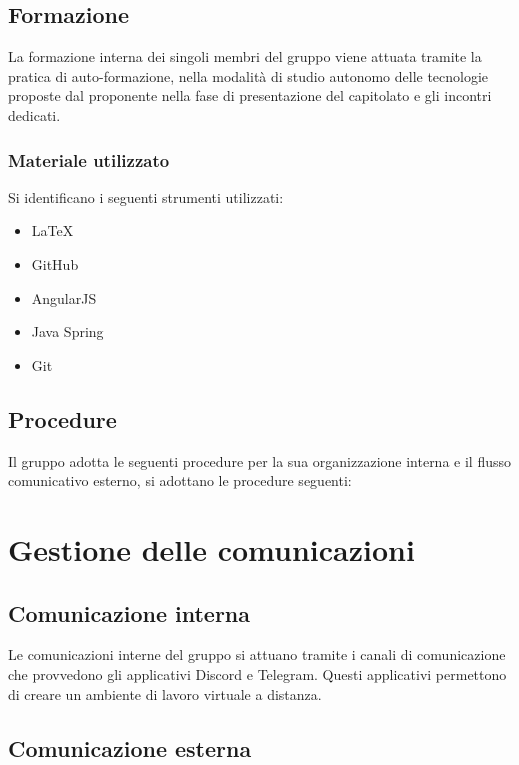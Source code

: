 \subsection{Formazione}

La formazione interna dei singoli membri del gruppo viene attuata tramite la pratica di auto-formazione, nella modalità di studio autonomo delle tecnologie proposte dal proponente nella fase di presentazione del capitolato e gli incontri dedicati.

\subsubsection{Materiale utilizzato}

Si identificano i seguenti strumenti utilizzati:

\begin{itemize}
\item LaTeX
\item GitHub
\item AngularJS
\item Java Spring
\item Git
\end{itemize}

\subsection{Procedure}

Il gruppo adotta le seguenti procedure per la sua organizzazione interna e il flusso comunicativo esterno, si adottano le procedure seguenti:

\section{Gestione delle comunicazioni}

\subsection{Comunicazione interna}

Le comunicazioni interne del gruppo si attuano tramite i canali di comunicazione che provvedono gli applicativi Discord e Telegram. Questi applicativi permettono di creare un ambiente di lavoro virtuale a distanza.

\subsection{Comunicazione esterna}

